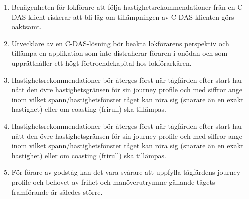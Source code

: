 \begin{enumerate}
    \item Benägenheten för lokförare att följa hastighetsrekommendationer från en C-DAS-klient riskerar att bli låg om tillämpningen av C-DAS-klienten görs oaktsamt.
    \item Utvecklare av en C-DAS-lösning bör beakta lokförarens perspektiv och tillämpa en applikation som inte distraherar föraren i onödan och som upprätthåller ett högt förtroendekapital hos lokförarkåren.
    \item Hastighetsrekommendationer bör återges först när tågfärden efter start har nått den övre hastighetsgränsen för sin journey profile och med siffror ange inom vilket spann/hastighetsfönster tåget kan röra sig (snarare än en exakt hastighet) eller om coasting (frirull) ska tillämpas.
    \item Hastighetsrekommendationer bör återges först när tågfärden efter start har nått den övre hastighetsgränsen för sin journey profile och med siffror ange inom vilket spann/hastighetsfönster tåget kan röra sig (snarare än en exakt hastighet) eller om coasting (frirull) ska tillämpas.
    \item För förare av godståg kan det vara svårare att uppfylla tågfärdens journey profile och behovet av frihet och manöverutrymme gällande tågets framförande är således större.
\end{enumerate}